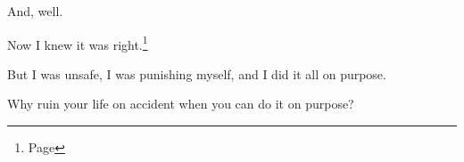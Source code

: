 \begin{paracol}{2}
\begin{leftcolumn}
And, well.

Now I knew it was right.\footnote{Page \pageref{gender:gender}}

But I was unsafe, I was punishing myself, and I did it all on purpose.

\begin{ally}
Why ruin your life on accident when you can do it on purpose?
\end{ally}
\newpage

\end{leftcolumn}
\end{paracol}
\resetbackgroundcolor
